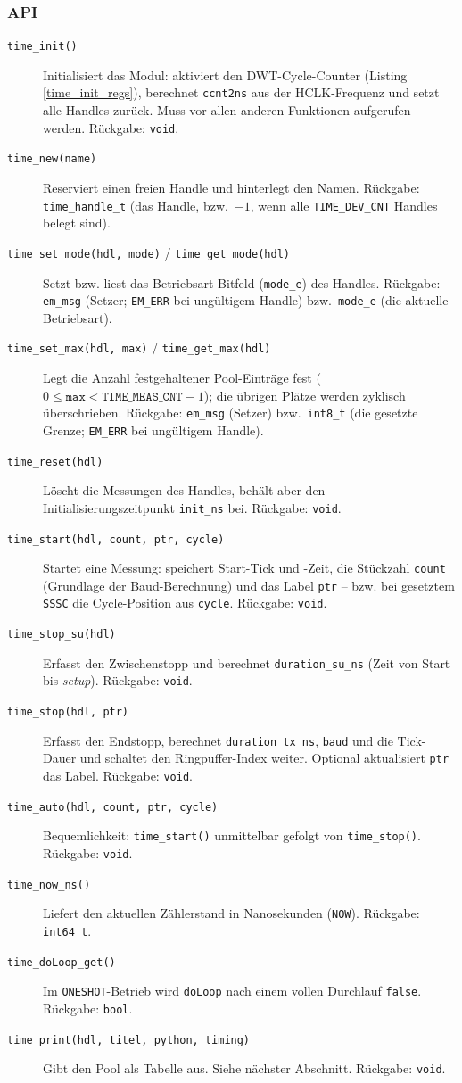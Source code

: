 \subsubsection*{API}
\begin{description}
\item[\texttt{time\_init()}] Initialisiert das Modul: aktiviert den
  DWT-Cycle-Counter (Listing \ref{time_init_regs}), berechnet
  \verb|ccnt2ns| aus der HCLK-Frequenz und setzt alle Handles zurück.
  Muss vor allen anderen Funktionen aufgerufen werden. Rückgabe: \verb|void|.
\item[\texttt{time\_new(name)}] Reserviert einen freien Handle und hinterlegt
  den Namen. Rückgabe: \verb|time_handle_t| (das Handle, bzw.\ $-1$, wenn
  alle \verb|TIME_DEV_CNT| Handles belegt sind).
\item[\texttt{time\_set\_mode(hdl, mode)} / \texttt{time\_get\_mode(hdl)}]
  Setzt bzw. liest das Betriebsart-Bitfeld (\verb|mode_e|) des Handles.
  Rückgabe: \verb|em_msg| (Setzer; \verb|EM_ERR| bei ungültigem Handle) bzw.\
  \verb|mode_e| (die aktuelle Betriebsart).
\item[\texttt{time\_set\_max(hdl, max)} / \texttt{time\_get\_max(hdl)}]
  Legt die Anzahl festgehaltener Pool-Einträge fest ($0 \le \mathtt{max} <
  \mathtt{TIME\_MEAS\_CNT}-1$); die übrigen Plätze werden zyklisch
  überschrieben. Rückgabe: \verb|em_msg| (Setzer) bzw.\ \verb|int8_t| (die
  gesetzte Grenze; \verb|EM_ERR| bei ungültigem Handle).
\item[\texttt{time\_reset(hdl)}] Löscht die Messungen des Handles, behält
  aber den Initialisierungszeitpunkt \verb|init_ns| bei. Rückgabe: \verb|void|.
\item[\texttt{time\_start(hdl, count, ptr, cycle)}] Startet eine Messung:
  speichert Start-Tick und -Zeit, die Stückzahl \verb|count| (Grundlage
  der Baud-Berechnung) und das Label \verb|ptr| -- bzw. bei gesetztem
  \verb|SSSC| die Cycle-Position aus \verb|cycle|. Rückgabe: \verb|void|.
\item[\texttt{time\_stop\_su(hdl)}] Erfasst den Zwischenstopp und berechnet
  \verb|duration_su_ns| (Zeit von Start bis \emph{setup}). Rückgabe:
  \verb|void|.
\item[\texttt{time\_stop(hdl, ptr)}] Erfasst den Endstopp, berechnet
  \verb|duration_tx_ns|, \verb|baud| und die Tick-Dauer und schaltet den
  Ringpuffer-Index weiter. Optional aktualisiert \verb|ptr| das Label.
  Rückgabe: \verb|void|.
\item[\texttt{time\_auto(hdl, count, ptr, cycle)}] Bequemlichkeit:
  \verb|time_start()| unmittelbar gefolgt von \verb|time_stop()|. Rückgabe:
  \verb|void|.
\item[\texttt{time\_now\_ns()}] Liefert den aktuellen Zählerstand in
  Nanosekunden (\verb|NOW|). Rückgabe: \verb|int64_t|.
\item[\texttt{time\_doLoop\_get()}] Im \verb|ONESHOT|-Betrieb wird
  \verb|doLoop| nach einem vollen Durchlauf \verb|false|. Rückgabe:
  \verb|bool|.
\item[\texttt{time\_print(hdl, titel, python, timing)}] Gibt den Pool als
  Tabelle aus. Siehe nächster Abschnitt. Rückgabe: \verb|void|.
\end{description}

